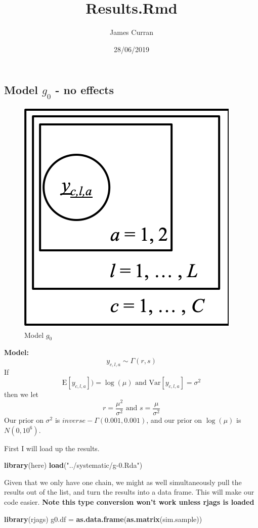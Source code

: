 \documentclass[]{article}
\title{Results.Rmd}
\author{James Curran}
\date{28/06/2019}
\newenvironment{Shaded}{\begin{snugshade}}{\end{snugshade}}
\newcommand{\KeywordTok}[1]{\textcolor[rgb]{0.13,0.29,0.53}{\textbf{#1}}}
\newcommand{\NormalTok}[1]{#1}
\newcommand{\StringTok}[1]{\textcolor[rgb]{0.31,0.60,0.02}{#1}}
\begin{document}
\maketitle

\hypertarget{model-g_0---no-effects}{%
\subsection{\texorpdfstring{Model \(g_0\) - no
effects}{Model g\_0 - no effects}}\label{model-g_0---no-effects}}

\begin{figure}
\includegraphics[width=0.25\linewidth]{g0} \caption{Model $g_0$}\label{fig:g0}
\end{figure}

\textbf{Model:} \[
y_{c,l,a} \sim \Gamma(r,s)
\] If \[
\mathrm{E}[y_{c,l,a}]) = \log(\mu)\mbox{ and }\mathrm{Var}[y_{c,l,a}] = \sigma^2
\] then we let \[
r  = \frac{\mu^2}{\sigma^2}\mbox{ and }s = \frac{\mu}{\sigma^2}
\] Our prior on \(\sigma^2\) is \(inverse-\Gamma(0.001, 0.001)\), and
our prior on \(\log(\mu)\) is \(N(0, 10^6)\).

First I will load up the results.

\begin{Shaded}
\begin{Highlighting}[]
\KeywordTok{library}\NormalTok{(here)}
\KeywordTok{load}\NormalTok{(}\StringTok{"../systematic/g-0.Rda"}\NormalTok{)}
\end{Highlighting}
\end{Shaded}

Given that we only have one chain, we might as well simultaneously pull
the results out of the list, and turn the results into a data frame.
This will make our code easier. \textbf{Note this type conversion won't
work unless rjags is loaded}

\begin{Shaded}
\begin{Highlighting}[]
\KeywordTok{library}\NormalTok{(rjags)}
\NormalTok{g0.df =}\StringTok{ }\KeywordTok{as.data.frame}\NormalTok{(}\KeywordTok{as.matrix}\NormalTok{(sim.sample))}
\end{Highlighting}
\end{Shaded}
\end{document}
